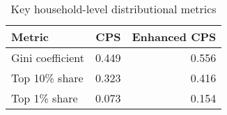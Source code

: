 \begin{table}[h]
    \centering
    \caption{Key household-level distributional metrics}
    \label{tab:household_metrics}
    \begin{tabular}{lrr}
    \toprule
    Metric & CPS & Enhanced CPS \\
    \midrule
    Gini coefficient & 0.449 & 0.556 \\
    Top 10\% share & 0.323 & 0.416 \\
    Top 1\% share & 0.073 & 0.154 \\
    \bottomrule
    \end{tabular}
\end{table}
